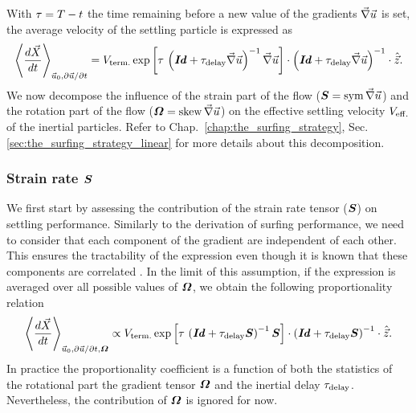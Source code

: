 With $\tau = T - t$ the time remaining before a new value of the gradients $\vec{\nabla} \vec{u}$ is set, the average velocity of the settling particle is expressed as
\begin{equation}
	\label{eq:inertial_performance}
	\left\langle \frac{d \vec{X}}{dt} \right\rangle_{\vec{u}_0, \partial \vec{u} / \partial t} = V_{\mathrm{term.}} \exp \left[ \tau \, \left( \boldsymbol{\mathit{Id}} + \tau_{\mathrm{delay}} \vec{\nabla} \vec{u} \right)^{-1} \vec{\nabla} \vec{u} \right] \cdot \left( \boldsymbol{\mathit{Id}} + \tau_{\mathrm{delay}} \vec{\nabla} \vec{u} \right)^{-1} \cdot \hat{\vec{z}}.
\end{equation}
We now decompose the influence of the strain part of the flow ($\boldsymbol{S} = \operatorname{sym} \vec{\nabla} \vec{u}$) and the rotation part of the flow ($\boldsymbol{\varOmega} = \operatorname{skew} \vec{\nabla} \vec{u}$) on the effective settling velocity $V_{\mathrm{eff.}}$ of the inertial particles.
Refer to Chap.~\ref{chap:the_surfing_strategy}, Sec.\ref{sec:the_surfing_strategy_linear} for more details about this decomposition.

\subsubsection{Strain rate $\boldsymbol{S}$}

We first start by assessing the contribution of the strain rate tensor ($\boldsymbol{S}$) on settling performance.
Similarly to the derivation of surfing performance, we need to consider that each component of the gradient are independent of each other.
This ensures the tractability of the expression even though it is known that these components are correlated \citep{buaria2022vorticity}.
In the limit of this assumption, if the expression is averaged over all possible values of $\boldsymbol{\varOmega}$, we obtain the following proportionality relation
\begin{equation}
	\left\langle \frac{d \vec{X}}{dt} \right\rangle_{\vec{u}_0, \partial \vec{u} / \partial t, \boldsymbol{\varOmega}} \propto V_{\mathrm{term.}} \exp \left[ \tau \, \left( \boldsymbol{\mathit{Id}} + \tau_{\mathrm{delay}} \boldsymbol{S} \right)^{-1} \boldsymbol{S} \right] \cdot \left( \boldsymbol{\mathit{Id}} + \tau_{\mathrm{delay}} \boldsymbol{S} \right)^{-1} \cdot \hat{\vec{z}}.
\end{equation}
In practice the proportionality coefficient is a function of both the statistics of the rotational part the gradient tensor $\boldsymbol{\varOmega}$ and the inertial delay $\tau_{\mathrm{delay}}$.
Nevertheless, the contribution of $\boldsymbol{\varOmega}$ is ignored for now.

